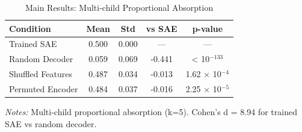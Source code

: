 
\begin{table}[htbp]
\centering
\caption{Main Results: Multi-child Proportional Absorption}
\label{tab:absorption_results}
\begin{tabular}{|l|c|c|c|c|}
\hline
\textbf{Condition} & \textbf{Mean} & \textbf{Std} & \textbf{vs SAE} & \textbf{p-value} \\
\hline
Trained SAE & 0.500 & 0.000 & --- & --- \\
Random Decoder & 0.059 & 0.069 & -0.441 & < 10$^{-133}$ \\
Shuffled Features & 0.487 & 0.034 & -0.013 & 1.62 $\times$ 10$^{-4}$ \\
Permuted Encoder & 0.484 & 0.037 & -0.016 & 2.25 $\times$ 10$^{-5}$ \\
\hline
\end{tabular}
\smallskip
\textit{Notes:} Multi-child proportional absorption (k=5). Cohen's d = 8.94 for trained SAE vs random decoder.
\end{table}
